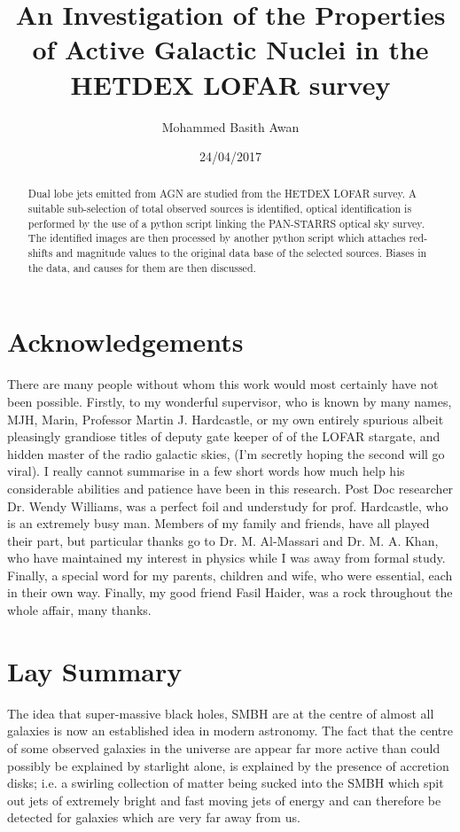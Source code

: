 \documentclass{article}
\title{An Investigation of the Properties of Active Galactic Nuclei in the HETDEX LOFAR survey}
\author{Mohammed Basith Awan}
\date{24/04/2017}
\begin{document}
\maketitle

\begin{abstract}
    Dual lobe jets emitted from AGN are studied from the HETDEX LOFAR survey. A suitable sub-selection of total observed sources is identified, optical identification is performed by the use of a python script linking the PAN-STARRS optical sky survey. The identified images are then processed by another python script which attaches red-shifts and magnitude values to the original data base of the selected sources. Biases in the data, and causes for them are then discussed.
\end{abstract}

\tableofcontents

\section{Acknowledgements}

There are many people without whom this work would most certainly have not been possible. Firstly, to my wonderful supervisor, who is known by many names, MJH, Marin, Professor Martin J. Hardcastle, or my own entirely spurious albeit pleasingly grandiose titles of deputy gate keeper of of the LOFAR stargate, and hidden master of the radio galactic skies, (I'm secretly hoping the second will go viral). I really cannot summarise in a few short words how much help his considerable abilities and patience have been in this research. Post Doc researcher Dr. Wendy Williams, was a perfect foil and understudy for prof. Hardcastle, who is an extremely busy man. Members of my family and friends, have all played their part, but particular thanks go to Dr. M. Al-Massari and Dr. M. A. Khan, who have maintained my interest in physics while I was away from formal study. Finally, a special word for my parents, children and wife, who were essential, each in their own way. Finally, my good friend Fasil Haider, was a rock throughout the whole affair, many thanks.

\section{Lay Summary}
The idea that super-massive black holes, SMBH are at the centre of almost all galaxies is now an established idea in modern astronomy. The fact that the centre of some observed galaxies in the universe are appear far more active than could possibly be explained by starlight alone, is explained by the presence of accretion disks; i.e. a swirling collection of matter being sucked into the SMBH which spit out jets of extremely bright and fast moving jets of energy and can therefore be detected for galaxies which are very far away from us.
\end{document}

